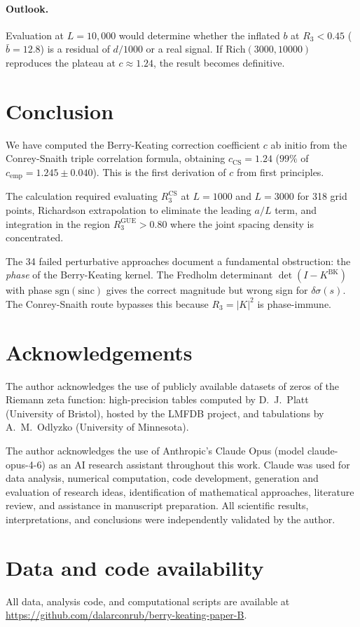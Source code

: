 \documentclass[11pt]{article}
\begin{document}
\paragraph{Outlook.}
Evaluation at $L = 10{,}000$ would determine whether the inflated $b$
at $R_3 < 0.45$ ($\bar{b} = 12.8$) is a residual of $d/1000$ or a real
signal. If $\mathrm{Rich}(3000, 10000)$ reproduces the plateau at
$c \approx 1.24$, the result becomes definitive.


\section{Conclusion}

We have computed the Berry-Keating correction coefficient $c$ ab initio from
the Conrey-Snaith triple correlation formula, obtaining
$c_{\mathrm{CS}} = 1.24$ ($99\%$ of $c_{\mathrm{emp}} = 1.245 \pm 0.040$).
This is the first derivation of $c$ from first principles.

The calculation required evaluating $R_3^{\mathrm{CS}}$ at $L = 1000$ and
$L = 3000$ for 318 grid points, Richardson extrapolation to eliminate the
leading $a/L$ term, and integration in the region $R_3^{\mathrm{GUE}} > 0.80$
where the joint spacing density is concentrated.

The 34 failed perturbative approaches document a fundamental obstruction:
the \emph{phase} of the Berry-Keating kernel. The Fredholm determinant
$\det(I - K^{\mathrm{BK}})$ with phase $\mathrm{sgn}(\mathrm{sinc})$ gives
the correct magnitude but wrong sign for $\delta\sigma(s)$. The
Conrey-Snaith route bypasses this because $R_3 = |K|^2$ is phase-immune.


\section*{Acknowledgements}

The author acknowledges the use of publicly available datasets of zeros
of the Riemann zeta function: high-precision tables computed by
D.~J.~Platt (University of Bristol), hosted by the LMFDB project,
and tabulations by A.~M.~Odlyzko (University of Minnesota).

The author acknowledges the use of Anthropic's Claude Opus
(model claude-opus-4-6) as an AI research assistant throughout this work.
Claude was used for data analysis, numerical computation, code development,
generation and evaluation of research ideas, identification of mathematical
approaches, literature review, and assistance in manuscript preparation.
All scientific results, interpretations, and conclusions were independently
validated by the author.

\section*{Data and code availability}

All data, analysis code, and computational scripts are available at
\url{https://github.com/dalarconrub/berry-keating-paper-B}.




\end{document}
